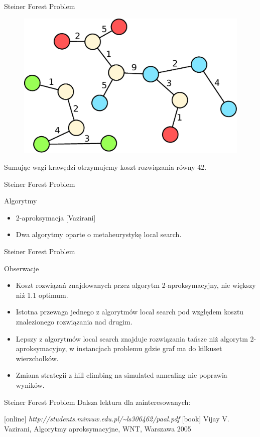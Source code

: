 \begin{frame}{Steiner Forest Problem}
\begin{figure}[ht]
\includegraphics[scale=0.32]{sf_example3.eps}
\end{figure}
Sumując wagi krawędzi otrzymujemy koszt rozwiązania równy 42.
\end{frame}

\begin{frame}{Steiner Forest Problem}
\begin{block}{Algorytmy}
\begin{itemize}
\item 2-aproksymacja [Vazirani]
\item Dwa algorytmy oparte o metaheurystykę local search.
\end{itemize}
\end{block}
\end{frame}

\begin{frame}{Steiner Forest Problem}
\begin{block}{Obserwacje}
\begin{itemize}
\item Koszt rozwiązań znajdowanych przez algorytm 2-aproksymacyjny, nie większy niż 1.1 optimum.
\item Istotna przewaga jednego z algorytmów local search pod względem kosztu znalezionego rozwiązania nad drugim.
\item Lepszy z algorytmów local search znajduje rozwiązania tańsze niż algorytm 2-aproksymacyjny, w instancjach problemu gdzie graf ma do kilkuset wierzchołków.
\item Zmiana strategii z hill climbing na simulated annealing nie poprawia wyników.
\end{itemize}
\end{block}
\end{frame}

\begin{frame}{Steiner Forest Problem}
Dalsza lektura dla zainteresowanych:
\begin{thebibliography}{9}
[online]
 {\em http://students.mimuw.edu.pl/\textasciitilde ls306462/paal.pdf}
[book]
 Vijay V. Vazirani, Algorytmy aproksymacyjne, WNT, Warszawa 2005
\end{thebibliography}
\end{frame}
